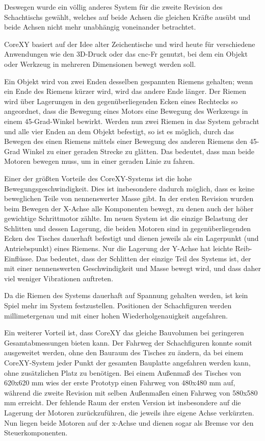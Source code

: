 Deswegen wurde ein völlig anderes System für die zweite Revision des
Schachtischs gewählt, welches auf beide Achsen die gleichen Kräfte
ausübt und beide Achsen nicht mehr unabhängig voneinander betrachtet.

CoreXY basiert auf der Idee alter Zeichentische und wird heute für
verschiedene Anwendungen wie den 3D-Druck oder das \gls{cnc}-Fr genutzt,
bei dem ein Objekt oder Werkzeug in mehreren Dimensionen bewegt werden
soll.

Ein Objekt wird von zwei Enden desselben gespannten Riemens gehalten;
wenn ein Ende des Riemens kürzer wird, wird das andere Ende länger. Der
Riemen wird über Lagerungen in den gegenüberliegenden Ecken eines
Rechtecks so angeordnet, dass die Bewegung eines Motors eine Bewegung
des Werkzeugs in einem 45-Grad-Winkel bewirkt. Werden nun zwei Riemen in
das System gebracht und alle vier Enden an dem Objekt befestigt, so ist
es möglich, durch das Bewegen des einen Riemens mittels einer Bewegung
des anderen Riemens den 45-Grad Winkel zu einer geraden Strecke zu
glätten. Das bedeutet, dass man beide Motoren bewegen muss, um in einer
geraden Linie zu fahren.

Einer der größten Vorteile des CoreXY-Systems ist die hohe
Bewegungsgeschwindigkeit. Dies ist insbesondere dadurch möglich, dass es
keine beweglichen Teile von nennenswerter Masse gibt. In der ersten
Revision wurden beim Bewegen der X-Achse alle Komponenten bewegt, zu
denen auch der höher gewichtige Schrittmotor zählte. Im neuen System ist
die einzige Belastung der Schlitten und dessen Lagerung, die beiden
Motoren sind in gegenüberliegenden Ecken des Tisches dauerhaft befestigt
und dienen jeweils als ein Lagerpunkt (und Antriebspunkt) eines Riemens.
Nur die Lagerung der Y-Achse hat leichte Reib-Einflüsse. Das bedeutet,
dass der Schlitten der einzige Teil des Systems ist, der mit einer
nennenswerten Geschwindigkeit und Masse bewegt wird, und dass daher viel
weniger Vibrationen auftreten.

Da die Riemen des Systems dauerhaft auf Spannung gehalten werden, ist
kein Spiel mehr im System festzustellen. Positionen der Schachfiguren
werden millimetergenau und mit einer hohen Wiederholgenauigkeit
angefahren.

Ein weiterer Vorteil ist, dass CoreXY das gleiche Bauvolumen bei
geringeren Gesamtabmessungen bieten kann. Der Fahrweg der Schachfiguren
konnte somit ausgeweitet werden, ohne den Bauraum des Tisches zu ändern,
da bei einem CoreXY-System jeder Punkt der gesamten Bauplatte angefahren
werden kann, ohne zusätzlichen Platz zu benötigen. Bei einem Außenmaß
des Tisches von 620x620 mm wies der erste Prototyp einen Fahrweg von
480x480 mm auf, während die zweite Revision mit selben Außenmaßen einen
Fahrweg von 580x580 mm erreicht. Der fehlende Raum der ersten Version
ist insbesondere auf die Lagerung der Motoren zurückzuführen, die
jeweils ihre eigene Achse verkürzten. Nun liegen beide Motoren auf der
x-Achse und dienen sogar als Bremse vor den Steuerkomponenten.


